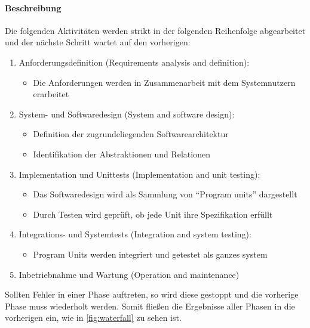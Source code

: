 \documentclass[ngerman,color=3b]{tuda_summary}
\begin{document}
\paragraph{Beschreibung}
Die folgenden Aktivitäten werden strikt in der folgenden Reihenfolge abgearbeitet und der nächste Schritt wartet auf den vorherigen:
\begin{enumerate}
    \item Anforderungsdefinition (Requirements analysis and definition):\begin{itemize}
              \item Die Anforderungen werden in Zusammenarbeit mit dem Systemnutzern erarbeitet
          \end{itemize}
    \item System- und Softwaredesign (System and software design):\begin{itemize}
              \item Definition der zugrundeliegenden Softwarearchitektur
              \item Identifikation der Abstraktionen und Relationen
          \end{itemize}
    \item Implementation und Unittests (Implementation and unit
          testing):\begin{itemize}
              \item Das Softwaredesign wird als Sammlung von \enquote{Program units} dargestellt
              \item Durch Testen wird geprüft, ob jede Unit ihre Spezifikation erfüllt
          \end{itemize}
    \item Integrations- und Systemtests (Integration and system
          testing):\begin{itemize}
              \item Program Units werden integriert und getestet als ganzes system
          \end{itemize}
    \item Inbetriebnahme und Wartung (Operation and maintenance)
\end{enumerate}

Sollten Fehler in einer Phase auftreten, so wird diese gestoppt und die vorherige Phase muss wiederholt werden. Somit fließen die Ergebnisse aller Phasen in die vorherigen ein, wie in \ref{fig:waterfall} zu sehen ist.
\end{document}
